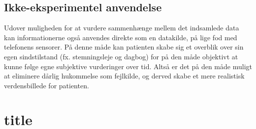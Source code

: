 \subsection{Ikke-eksperimentel anvendelse}
Udover muligheden for at vurdere sammenhænge mellem det indsamlede data kan informationerne også anvendes direkte som en datakilde, på lige fod med telefonens sensorer.
På denne måde kan patienten skabe sig et overblik over sin egen sindstilstand (fx. stemningsleje og dagbog) for på den måde objektivt at kunne følge egne subjektive vurderinger over tid.
Altså er det på den måde muligt at eliminere dårlig hukommelse som fejlkilde, og derved skabe et mere realistisk verdensbillede for patienten.

\section{title}
